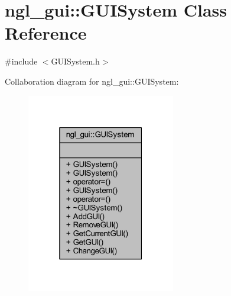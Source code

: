 \hypertarget{classngl__gui_1_1_g_u_i_system}{}\section{ngl\+\_\+gui\+:\+:G\+U\+I\+System Class Reference}
\label{classngl__gui_1_1_g_u_i_system}


{\ttfamily \#include $<$G\+U\+I\+System.\+h$>$}



Collaboration diagram for ngl\+\_\+gui\+:\+:G\+U\+I\+System\+:\nopagebreak
\begin{figure}[H]
\begin{center}
\leavevmode
\includegraphics[width=184pt]{classngl__gui_1_1_g_u_i_system__coll__graph}
\end{center}
\end{figure}
